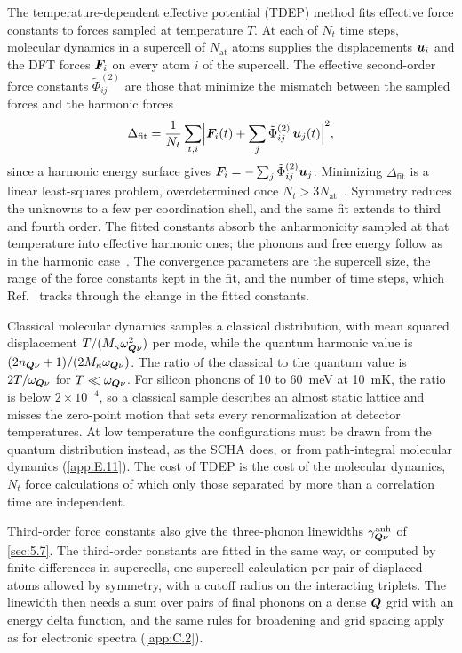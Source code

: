 The temperature-dependent effective potential (TDEP) method fits effective force constants to forces sampled at temperature $T$. At each of $N_t$ time steps, molecular dynamics in a supercell of $N_{\mathrm{at}}$ atoms supplies the displacements $\bm{u}_i$ and the DFT forces $\bm{F}_i$ on every atom $i$ of the supercell. The effective second-order force constants $\tilde\Phi^{(2)}_{ij}$ are those that minimize the mismatch between the sampled forces and the harmonic forces
\begin{equation}
  \Delta_{\mathrm{fit}} = \frac{1}{N_t}\sum_{t,i}\Bigl|\bm{F}_{i}(t) + \sum_j\tilde\Phi^{(2)}_{ij}\,\bm{u}_j(t)\Bigr|^2 ,
  \label{eq:E.8-tdep}
\end{equation}
since a harmonic energy surface gives $\bm{F}_i = -\sum_j\tilde\Phi^{(2)}_{ij}\bm{u}_j$. Minimizing $\Delta_{\mathrm{fit}}$ is a linear least-squares problem, overdetermined once $N_t > 3N_{\mathrm{at}}$~\cite[Eq.~(3), with the opposite sign convention for the force constants]{hellman2011lattice}. Symmetry reduces the unknowns to a few per coordination shell, and the same fit extends to third and fourth order. The fitted constants absorb the anharmonicity sampled at that temperature into effective harmonic ones; the phonons and free energy follow as in the harmonic case~\cite{hellman2013temperature}. The convergence parameters are the supercell size, the range of the force constants kept in the fit, and the number of time steps, which Ref.~\cite[Fig.~1]{hellman2011lattice} tracks through the change in the fitted constants.

Classical molecular dynamics samples a classical distribution, with mean squared displacement $T/(M_\kappa\omega_{\bm{Q}\nu}^2)$ per mode, while the quantum harmonic value is $(2n_{\bm{Q}\nu} + 1)/(2M_\kappa\omega_{\bm{Q}\nu})$. The ratio of the classical to the quantum value is $2T/\omega_{\bm{Q}\nu}$ for $T \ll \omega_{\bm{Q}\nu}$. For silicon phonons of 10 to \SI{60}{meV} at \SI{10}{mK}, the ratio is below $2\times10^{-4}$, so a classical sample describes an almost static lattice and misses the zero-point motion that sets every renormalization at detector temperatures. At low temperature the configurations must be drawn from the quantum distribution instead, as the SCHA does, or from path-integral molecular dynamics (\cref{app:E.11}). The cost of TDEP is the cost of the molecular dynamics, $N_t$ force calculations of which only those separated by more than a correlation time are independent.

Third-order force constants also give the three-phonon linewidths $\gamma^{\mathrm{anh}}_{\bm{Q}\nu}$ of \cref{sec:5.7}. The third-order constants are fitted in the same way, or computed by finite differences in supercells, one supercell calculation per pair of displaced atoms allowed by symmetry, with a cutoff radius on the interacting triplets. The linewidth then needs a sum over pairs of final phonons on a dense $\bm{Q}$ grid with an energy delta function, and the same rules for broadening and grid spacing apply as for electronic spectra (\cref{app:C.2}).

